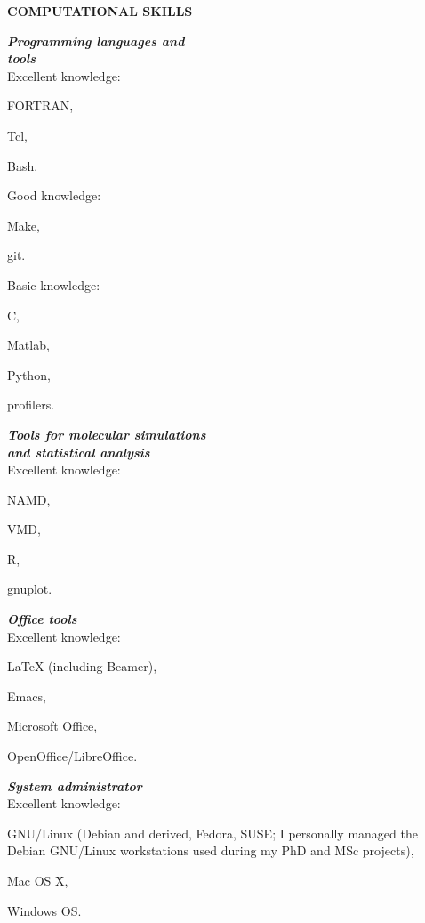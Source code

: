 \documentclass[a4paper,10pt,final]{memoir}
\newcommand{\Sep}{\vspace{1.em}}
\newcommand{\SmallSep}{\vspace{0.3em}}
\newcommand{\CVSection}[1]
	{\Large\textbf{#1}\par
	\SmallSep\normalsize\normalfont}
\newcommand{\CVItem}[2]
	{\textit{\textbf{\color{RoyalBlue} #1}} #2}
\begin{document}
\Sep
\CVSection{COMPUTATIONAL SKILLS}
\begin{multicols}{3}
\CVItem{
Programming languages and \\
tools\hfill
} \\
Excellent knowledge:
\begin{compactitem}[\color{RoyalBlue}$\circ$]
\item FORTRAN,
\item Tcl,
\item Bash.
\end{compactitem}
Good knowledge:
\begin{compactitem}[\color{RoyalBlue}$\circ$]
\item Make,
\item git.
\end{compactitem}
Basic knowledge:
\begin{compactitem}[\color{RoyalBlue}$\circ$]
\item C,
\item Matlab,
\item Python,
\item profilers.
\end{compactitem}
\SmallSep
 
\CVItem{Tools for molecular simulations\\ and statistical analysis\hfill} \\
Excellent knowledge:
\begin{compactitem}[\color{RoyalBlue}$\circ$]
\item NAMD,
\item VMD,
\item R,
\item gnuplot.
\end{compactitem}
\SmallSep

\CVItem{Office tools\hfill} \\
Excellent knowledge:
\begin{compactitem}[\color{RoyalBlue}$\circ$]
\item \LaTeX{} (including Beamer),
\item Emacs,
\item Microsoft Office,
\item OpenOffice/LibreOffice. 
\end{compactitem}
\SmallSep

\CVItem{System administrator\hfill} \\
Excellent knowledge:
\begin{compactitem}[\color{RoyalBlue}$\circ$]
\item GNU/Linux (Debian and derived, Fedora, SUSE; I personally managed the Debian
  GNU/Linux workstations used during my PhD and MSc projects),
\item Mac OS X,
\item Windows OS.
\end{compactitem}
\SmallSep


\end{multicols}
\end{document}
